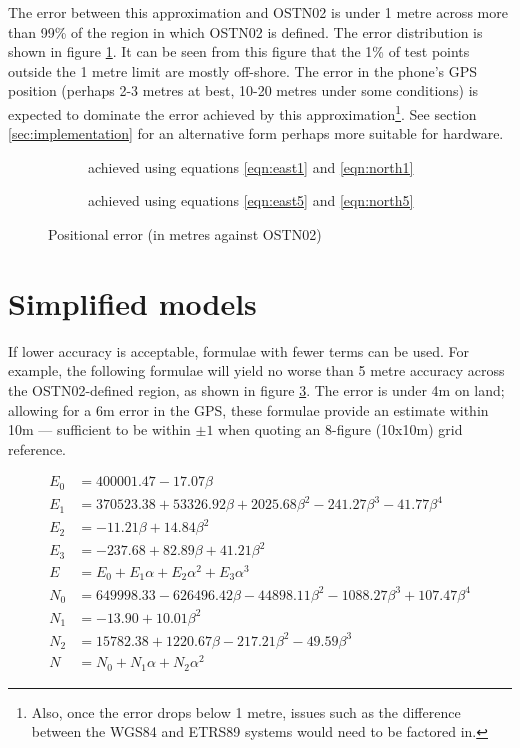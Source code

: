 \documentclass[10pt,a4paper]{article}
\def\gap{\hspace{2cm}}
\begin{document}
The error between this approximation and OSTN02 is under 1 metre across more
than 99\% of the region in which OSTN02 is defined.  The error distribution is
shown in figure \ref{fig:one_metre_model}.  It can be seen from this figure
that the 1\% of test points outside the 1 metre limit are mostly off-shore.
The error in the phone's GPS position (perhaps 2-3 metres at best, 10-20 metres
under some conditions) is expected to dominate the error achieved by this
approximation\footnote{Also, once the error drops below 1 metre, issues such as
the difference between the WGS84 and ETRS89 systems would need to be factored
in.}.  See section \ref{sec:implementation} for an alternative form perhaps
more suitable for hardware.

\begin{figure}[htb]
  \begin{subfigure}[b]{0.4\textwidth}
  \centering
  \fbox{
    
  }
  \caption{achieved using equations \eqref{eqn:east1} and \eqref{eqn:north1}}
  \label{fig:one_metre_model}
\end{subfigure}
\gap
  \begin{subfigure}[b]{0.4\textwidth}
  \centering
  \fbox{
    
  }
  \caption{achieved using equations \eqref{eqn:east5} and \eqref{eqn:north5}}
  \label{fig:5-metre-model}
\end{subfigure}
  \caption{Positional error (in metres against OSTN02)}
\hrulefill
\end{figure}

\section {Simplified models}

If lower accuracy is acceptable, formulae with fewer terms can be used.  For
example, the following formulae will yield no worse than 5 metre accuracy
across the OSTN02-defined region, as shown in figure \ref{fig:5-metre-model}.
The error is under 4m on land; allowing for a 6m error in the GPS, these
formulae provide an estimate within 10m --- sufficient to be within $\pm{}1$
when quoting an 8-figure (10x10m) grid reference.

\begin{align}
E_0 &= 400001.47 -17.07\beta\nonumber \\
E_1 &= 370523.38 +53326.92\beta +2025.68\beta^2 -241.27\beta^3 -41.77\beta^4\nonumber \\
E_2 &= -11.21\beta +14.84\beta^2\nonumber \\
E_3 &= -237.68 +82.89\beta +41.21\beta^2\nonumber \\
E &= E_0 +E_1\alpha +E_2\alpha^2 +E_3\alpha^3
  \label{eqn:east5}
\\[1ex]
N_0 &= 649998.33 -626496.42\beta -44898.11\beta^2 -1088.27\beta^3 +107.47\beta^4\nonumber \\
N_1 &= -13.90 +10.01\beta^2\nonumber \\
N_2 &= 15782.38 +1220.67\beta -217.21\beta^2 -49.59\beta^3\nonumber \\
N &= N_0 +N_1\alpha +N_2\alpha^2
  \label{eqn:north5}
\end{align}
\end{document}
